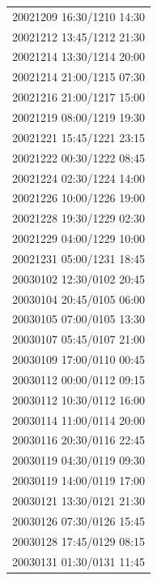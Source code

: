 \documentclass[draft]{agujournal2019}
\begin{document}
\begin{center}
\begin{longtable}{c}
20021209 16:30/1210 14:30 \\
20021212 13:45/1212 21:30 \\
20021214 13:30/1214 20:00 \\
20021214 21:00/1215 07:30 \\
20021216 21:00/1217 15:00 \\
20021219 08:00/1219 19:30 \\
20021221 15:45/1221 23:15 \\
20021222 00:30/1222 08:45 \\
20021224 02:30/1224 14:00 \\
20021226 10:00/1226 19:00 \\
20021228 19:30/1229 02:30 \\
20021229 04:00/1229 10:00 \\
20021231 05:00/1231 18:45 \\
20030102 12:30/0102 20:45 \\
20030104 20:45/0105 06:00 \\
20030105 07:00/0105 13:30 \\
20030107 05:45/0107 21:00 \\
20030109 17:00/0110 00:45 \\
20030112 00:00/0112 09:15 \\
20030112 10:30/0112 16:00 \\
20030114 11:00/0114 20:00 \\
20030116 20:30/0116 22:45 \\
20030119 04:30/0119 09:30 \\
20030119 14:00/0119 17:00 \\
20030121 13:30/0121 21:30 \\
20030126 07:30/0126 15:45 \\
20030128 17:45/0129 08:15 \\
20030131 01:30/0131 11:45 \\
\end{longtable}
\end{center}

\pagebreak
\end{document}
